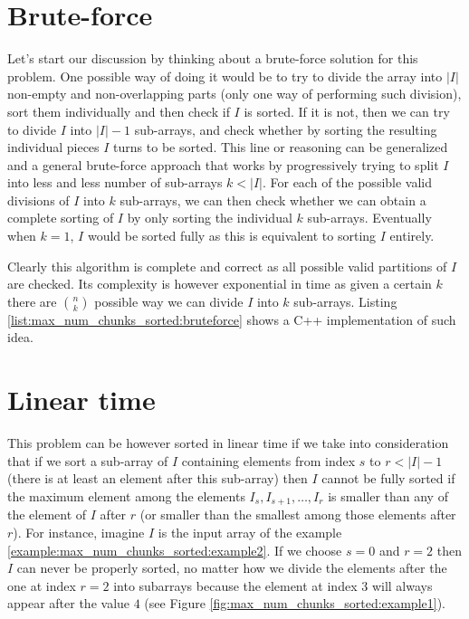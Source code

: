 \section{Brute-force}
\label{max_num_chunks_sorted:sec:bruteforce}


Let's start our discussion by thinking about a brute-force solution for this problem. 
One possible way of doing it would be to try to divide the array into $|I|$ non-empty and non-overlapping parts (only one way of performing such division), 
sort  them individually and then check if $I$ is sorted. 
If it is not, then we can try to divide $I$ into $|I|-1$ sub-arrays,
and check whether by sorting the resulting individual pieces $I$ turns to be sorted.
This line or reasoning can be generalized and a general brute-force approach
that works by progressively trying to split $I$ into less and less number of sub-arrays $k <|I|$.
For each of the possible valid divisions of $I$ into $k$ sub-arrays, we can then check whether 
we can obtain a complete sorting of $I$ by only sorting the individual $k$ sub-arrays.
Eventually when $k=1$, $I$ would be sorted fully as this is equivalent to sorting $I$ entirely.

Clearly this algorithm is complete and correct
as all possible valid partitions of $I$ are checked. Its complexity is however exponential
in time as given a certain $k$ there are ${n \choose k} $ possible way we can divide $I$ into $k$ sub-arrays. 
Listing \ref{list:max_num_chunks_sorted:bruteforce} shows a C++ implementation of such idea. 


\begin{minipage}{\linewidth}
	
\end{minipage}


\section{Linear time}
\label{max_num_chunks_sorted:sec:lineartime}
This problem can be however sorted in linear time if we take into consideration that if we sort a sub-array of $I$
containing elements from index $s$ to $r< |I|-1$  (there is at least an element after this sub-array) 
then $I$ cannot be fully sorted if the maximum element among the elements $I_s, I_{s+1},\ldots, I_r$
is smaller than any of the element of $I$ after $r$ (or smaller than the smallest among those elements after $r$). 
For instance, imagine $I$ is the input array of the example \ref{example:max_num_chunks_sorted:example2}. 
If we choose $s=0$ and $r=2$ then $I$ can never be properly sorted, no matter how we divide the elements after the one at index $r=2$ into subarrays
because the element at index $3$ will always appear after the value $4$ (see Figure \ref{fig:max_num_chunks_sorted:example1}).

